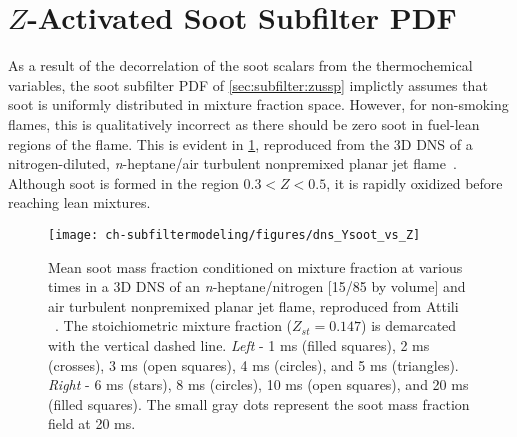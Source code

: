 \section{\texorpdfstring{$Z$}{Z}-Activated Soot Subfilter PDF}
\label{sec:subfilter:zassp}


As a result of the decorrelation of the soot scalars from the thermochemical variables, the soot subfilter PDF of \cref{sec:subfilter:zussp} implictly assumes that soot is uniformly distributed in mixture fraction space. However, for non-smoking flames, this is qualitatively incorrect as there should be zero soot in fuel-lean regions of the flame. This is evident in \cref{fig:subfilter:leszussp:ysvsz}, reproduced from the 3D DNS of a nitrogen-diluted, \textit{n}-heptane/air turbulent nonpremixed planar jet flame~\cite{attili2014}. Although soot is formed in the region $0.3 < Z < 0.5$, it is rapidly oxidized before reaching lean mixtures.

\begin{figure}[htb]
  \centering
  \texttt{[image: ch-subfiltermodeling/figures/dns\_Ysoot\_vs\_Z]}
  \caption[DNS of Turbulent Nonpremixed / Jet Flame, \texorpdfstring{$\langle Y_{\text{s}}|Z \rangle$}{<Ys|Z>} vs. \texorpdfstring{$Z$}{Z}]{Mean soot mass fraction conditioned on mixture fraction at various times in a 3D DNS of an \textit{n}-heptane/nitrogen [15/85 by volume] and air turbulent nonpremixed planar jet flame, reproduced from Attili \etal~\cite{attili2014}. The stoichiometric mixture fraction ($Z_{st} = 0.147$) is demarcated with the vertical dashed line. \textit{Left} - 1 ms (filled squares), 2 ms (crosses), 3 ms (open squares), 4 ms (circles), and 5 ms (triangles). \textit{Right} - 6 ms (stars), 8 ms (circles), 10 ms (open squares), and 20 ms (filled squares). The small gray dots represent the soot mass fraction field at 20 ms.}
  \label{fig:subfilter:leszussp:ysvsz}
\end{figure}

